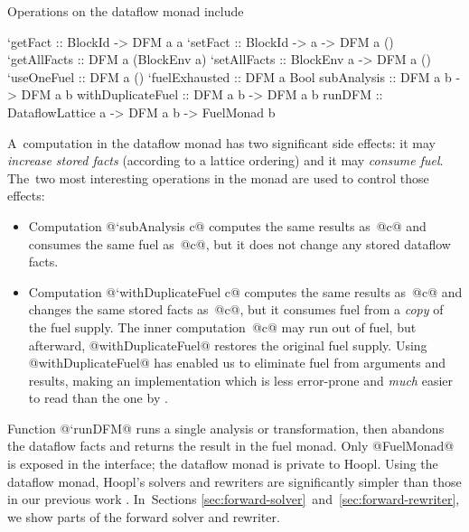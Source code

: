 \documentclass[blockstyle,preprint,natbib,nocopyrightspace]{sigplanconf}
\newcommand\ourlib{Hoopl}  %
\let\cite\citep
\def\authornote#1{\unskip\relax}
\newcommand{\john}[1]{\authornote{JD: #1}}
\newcommand\secreftwo[2]{Sections \ref{sec:#1}~and~\ref{sec:#2}}
\begin{document}
Operations on the dataflow monad include
\begin{code}
`getFact           :: BlockId ->      DFM a a
`setFact           :: BlockId -> a -> DFM a ()
`getAllFacts       :: DFM a (BlockEnv a)
`setAllFacts       :: BlockEnv a -> DFM a ()
`useOneFuel        :: DFM a ()
`fuelExhausted     :: DFM a Bool
subAnalysis       :: DFM a b -> DFM a b
withDuplicateFuel :: DFM a b -> DFM a b
runDFM :: DataflowLattice a -> DFM a b -> FuelMonad b
\end{code}
A~computation in the dataflow monad has two significant side effects:
it may \emph{increase stored facts} (according to a lattice ordering)
and it may \emph{consume fuel}.
The~two most interesting operations in the monad are used to control
those effects:
\begin{itemize}
\item
Computation @`subAnalysis c@ computes the same results as~@c@ and
consumes the same fuel as~@c@, but it does not change any stored
dataflow facts.
\item
Computation @`withDuplicateFuel c@ computes the same results as~@c@ and
changes the same stored facts as~@c@, but it consumes fuel from a
\emph{copy} of the fuel supply.
The inner computation~@c@ may run out of fuel, but afterward,
@withDuplicateFuel@ restores the original fuel supply.
Using @withDuplicateFuel@ has enabled us to eliminate fuel from
arguments and results, making an implementation which
is less error-prone and \emph{much} easier to
read than the one by \citet{ramsey-dias:applicative-flow-graph}. 
\end{itemize}
Function @`runDFM@ runs a single analysis or transformation, then
abandons the dataflow facts and returns the result in the fuel monad.
Only @FuelMonad@ is exposed in the interface;
the dataflow monad is private to \ourlib.
Using the dataflow monad, \ourlib's solvers and rewriters
are significantly simpler than those in our
previous work \cite{ramsey-dias:applicative-flow-graph}.
In~\secreftwo{forward-solver}{forward-rewriter},
we show parts of the forward solver and rewriter. 


\end{document}
